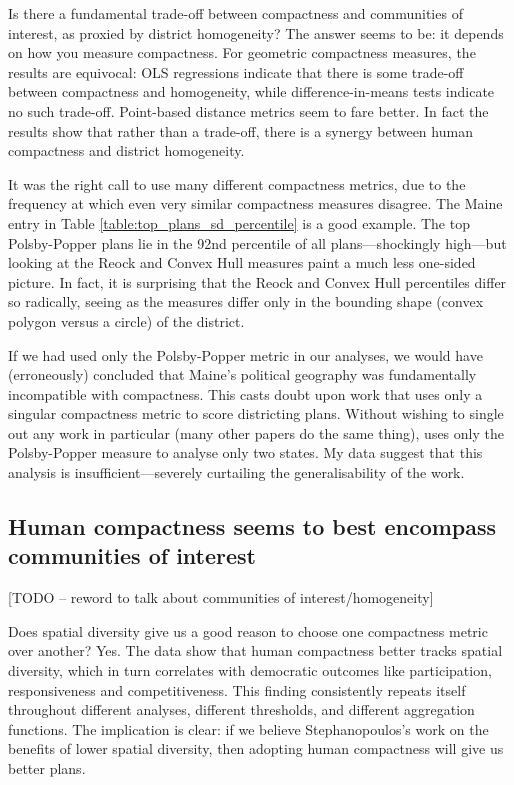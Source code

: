 \documentclass[]{article}
\begin{document}
Is there a fundamental trade-off between compactness and communities of
interest, as proxied by district homogeneity? The answer seems to be: it
depends on how you measure compactness. For geometric compactness
measures, the results are equivocal: OLS regressions indicate that there
is some trade-off between compactness and homogeneity, while
difference-in-means tests indicate no such trade-off. Point-based
distance metrics seem to fare better. In fact the results show that
rather than a trade-off, there is a synergy between human compactness
and district homogeneity.

It was the right call to use many different compactness metrics, due to
the frequency at which even very similar compactness measures disagree.
The Maine entry in Table \ref{table:top_plans_sd_percentile} is a good
example. The top Polsby-Popper plans lie in the 92nd percentile of all
plans---shockingly high---but looking at the Reock and Convex Hull
measures paint a much less one-sided picture. In fact, it is surprising
that the Reock and Convex Hull percentiles differ so radically, seeing
as the measures differ only in the bounding shape (convex polygon versus
a circle) of the district.

If we had used only the Polsby-Popper metric in our analyses, we would
have (erroneously) concluded that Maine's political geography was
fundamentally incompatible with compactness. This casts doubt upon work
that uses only a singular compactness metric to score districting plans.
Without wishing to single out any work in particular (many other papers
do the same thing), \cite{s2020} uses only the Polsby-Popper measure to
analyse only two states. My data suggest that this analysis is
insufficient---severely curtailing the generalisability of the work.

\hypertarget{human-compactness-seems-to-best-encompass-communities-of-interest}{%
\subsection{Human compactness seems to best encompass communities of
interest}\label{human-compactness-seems-to-best-encompass-communities-of-interest}}

{[}TODO -- reword to talk about communities of interest/homogeneity{]}

Does spatial diversity give us a good reason to choose one compactness
metric over another? Yes. The data show that human compactness better
tracks spatial diversity, which in turn correlates with democratic
outcomes like participation, responsiveness and competitiveness. This
finding consistently repeats itself throughout different analyses,
different thresholds, and different aggregation functions. The
implication is clear: if we believe Stephanopoulos's work on the
benefits of lower spatial diversity, then adopting human compactness
will give us better plans.
\end{document}
